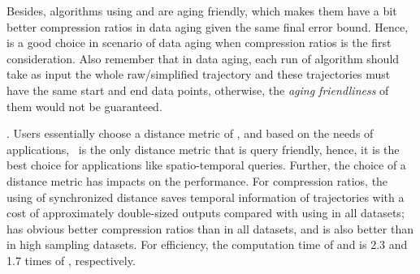 {Besides, algorithms \dpa using \ped and \sed are aging friendly, which makes them have a bit better compression ratios in data aging given the same final error bound. Hence, \dpa is a good choice in scenario of data aging when compression ratios is the first consideration. Also remember that in data aging, each run of algorithm \dpa should take as input the whole raw/simplified trajectory and these trajectories must have the same start and end data points, otherwise, the \emph{aging friendliness} of them would not be guaranteed.}

. Users essentially choose a distance metric of \ped, \sed and \dad based on the needs of applications, \eg~\sed is the only distance metric that is query friendly, hence, it is the best choice for applications like spatio-temporal queries.
%
Further, the choice of a distance metric has impacts on the performance.
For compression ratios, the using of synchronized distance \sed saves temporal information of trajectories with a cost of approximately double-sized outputs compared with using \ped in all datasets; \ped has obvious better compression ratios than \dad in all datasets, and \sed is also better than \dad in high sampling datasets.
For efficiency, the computation time of \ped and \sed is 2.3 and 1.7 times of \dad, respectively.



%
%
